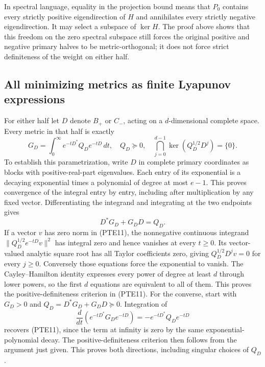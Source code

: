 In spectral language, equality in the projection bound means that
\(P_0\) contains every strictly positive eigendirection of \(H\) and
annihilates every strictly negative eigendirection.  It may select a
subspace of \(\ker H\).  The proof above shows that this freedom on the
zero spectral subspace still forces the original positive and negative
primary halves to be metric-orthogonal; it does not force strict
definiteness of the weight on either half.

\subsection{All minimizing metrics as finite Lyapunov expressions}

For either half let \(D\) denote \(B_+\) or \(C_-\), acting on a
\(d\)-dimensional complete space.  Every metric in that half is exactly
\begin{equation}\tag{PTE11}\label{eq:pte11}
 G_D=\int_0^\infty e^{-tD^*}Q_D e^{-tD}\,dt,
 \quad Q_D\succeq0,
 \quad \bigcap_{j=0}^{d-1}\ker(Q_D^{1/2}D^j)=\{0\}.
\end{equation}
To establish this parametrization, write \(D\) in complete primary
coordinates as blocks with positive-real-part eigenvalues.  Each
entry of its exponential is a decaying exponential times a polynomial
of degree at most \(e-1\).  This proves convergence of the integral
entry by entry, including after multiplication by any fixed vector.
Differentiating the integrand and integrating at the two endpoints
gives
\begin{equation}\tag{PTE12}\label{eq:pte12}
 D^*G_D+G_DD=Q_D.
\end{equation}
If a vector \(v\) has zero norm in (PTE11), the nonnegative continuous
integrand \(\|Q_D^{1/2}e^{-tD}v\|^2\) has integral zero and hence
vanishes at every \(t\geq0\).  Its vector-valued analytic square root
has all Taylor coefficients zero, giving
\(Q_D^{1/2}D^jv=0\) for every \(j\geq0\).  Conversely those equations
force the exponential to vanish.  The Cayley--Hamilton identity
expresses every power of degree at least \(d\) through lower powers,
so the first \(d\) equations are equivalent to all of them.  This
proves the positive-definiteness criterion in (PTE11).
For the converse, start with \(G_D>0\) and
\(Q_D=D^*G_D+G_DD\succeq0\).  Integration of
\[
 \frac{d}{dt}(e^{-tD^*}G_De^{-tD})=-e^{-tD^*}Q_De^{-tD}
\]
recovers (PTE11), since the term at infinity is zero by the same
exponential-polynomial decay.  The positive-definiteness criterion
then follows from the argument just given.  This proves both
directions, including singular choices of \(Q_D\).

